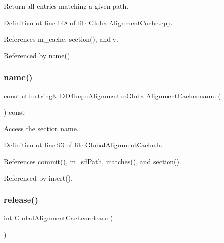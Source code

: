 Return all entries matching a given path. 

Definition at line 148 of file Global\+Alignment\+Cache.\+cpp.



References m\+\_\+cache, section(), and v.



Referenced by name().

\hypertarget{class_d_d4hep_1_1_alignments_1_1_global_alignment_cache_a17cba99abb03d99b933083030ccfa91f}{}\label{class_d_d4hep_1_1_alignments_1_1_global_alignment_cache_a17cba99abb03d99b933083030ccfa91f} 
\subsubsection{\texorpdfstring{name()}{name()}}
{\footnotesize\ttfamily const std\+::string\& D\+D4hep\+::\+Alignments\+::\+Global\+Alignment\+Cache\+::name (\begin{DoxyParamCaption}{ }\end{DoxyParamCaption}) const\hspace{0.3cm}{\ttfamily [inline]}}



Access the section name. 



Definition at line 93 of file Global\+Alignment\+Cache.\+h.



References commit(), m\+\_\+sd\+Path, matches(), and section().



Referenced by insert().

\hypertarget{class_d_d4hep_1_1_alignments_1_1_global_alignment_cache_a7de701232e1c2da3ca981de290805060}{}\label{class_d_d4hep_1_1_alignments_1_1_global_alignment_cache_a7de701232e1c2da3ca981de290805060} 
\subsubsection{\texorpdfstring{release()}{release()}}
{\footnotesize\ttfamily int Global\+Alignment\+Cache\+::release (\begin{DoxyParamCaption}{ }\end{DoxyParamCaption})}



